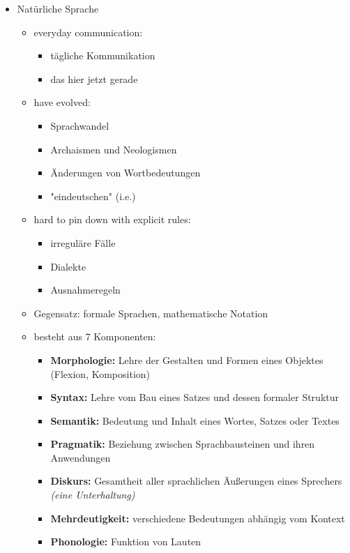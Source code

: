 \documentclass[15pt,a4]{article}
\begin{document}
	\begin{LARGE}
	\begin{itemize}
		\item Natürliche Sprache
			\begin{itemize}
				\item everyday communication:
					\begin{itemize}
	       				\item tägliche Kommunikation
				        \item das hier jetzt gerade
        			\end{itemize}
				\item have evolved:
					\begin{itemize}
						\item Sprachwandel
        				\item Archaismen und Neologismen
        				\item Änderungen von Wortbedeutungen
        				\item "eindeutschen" (i.e.)			
					\end{itemize}
				\item hard to pin down with explicit rules:
					\begin{itemize}
						\item irreguläre Fälle
				        \item Dialekte
				        \item Ausnahmeregeln
					\end{itemize}
				\item Gegensatz: formale Sprachen, mathematische Notation
				\item besteht aus 7 Komponenten:
					\begin{itemize}
						\item \textbf{Morphologie:} Lehre der Gestalten und Formen eines Objektes (Flexion, Komposition)
						\item \textbf{Syntax:} Lehre vom Bau eines Satzes und dessen formaler Struktur
						\item \textbf{Semantik:} Bedeutung und Inhalt eines Wortes, Satzes oder Textes
						\item \textbf{Pragmatik:} Beziehung zwischen Sprachbausteinen und ihren Anwendungen
						\item \textbf{Diskurs:} Gesamtheit aller sprachlichen Äußerungen eines Sprechers \textit{(eine Unterhaltung)}
						\item \textbf{Mehrdeutigkeit:} verschiedene Bedeutungen abhängig vom Kontext
						\item \textbf{Phonologie:} Funktion von Lauten

\end{itemize}
\end{itemize}
\end{itemize}
\end{LARGE}
\end{document}
